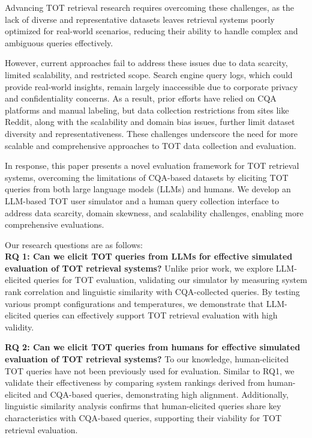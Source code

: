 Advancing TOT retrieval research requires overcoming these challenges, as the lack of diverse and representative datasets leaves retrieval systems poorly optimized for real-world scenarios, reducing their ability to handle complex and ambiguous queries effectively.



However, current approaches fail to address these issues due to data scarcity, limited scalability, and restricted scope. Search engine query logs, which could provide real-world insights, remain largely inaccessible due to corporate privacy \cite{barbaro2006face} and confidentiality \cite{Poblete10confidentiality} concerns. 
As a result, prior efforts have relied on CQA platforms and manual labeling, but data collection restrictions from sites like Reddit, along with the scalability and domain bias issues, further limit dataset diversity and representativeness. These challenges underscore the need for more scalable and comprehensive approaches to TOT data collection and evaluation.



In response, this paper presents a novel evaluation framework for TOT retrieval systems, overcoming the limitations of CQA-based datasets by eliciting TOT queries from both large language models (LLMs) and humans. We develop an LLM-based TOT user simulator and a human query collection interface to address data scarcity, domain skewness, and scalability challenges, enabling more comprehensive evaluations.

Our research questions are as follows:\\
\textbf{RQ 1: Can we elicit TOT queries from LLMs for effective simulated evaluation of TOT retrieval systems?}
Unlike prior work, we explore LLM-elicited queries for TOT evaluation, validating our simulator by measuring system rank correlation and linguistic similarity with CQA-collected queries. By testing various prompt configurations and temperatures, we demonstrate that LLM-elicited queries can effectively support TOT retrieval evaluation with high validity.



\textbf{RQ 2: Can we elicit TOT queries from humans for effective simulated evaluation of TOT retrieval systems?}
To our knowledge, human-elicited TOT queries have not been previously used for evaluation. Similar to RQ1, we validate their effectiveness by comparing system rankings derived from human-elicited and CQA-based queries, demonstrating high alignment. Additionally, linguistic similarity analysis confirms that human-elicited queries share key characteristics with CQA-based queries, supporting their viability for TOT retrieval evaluation.




